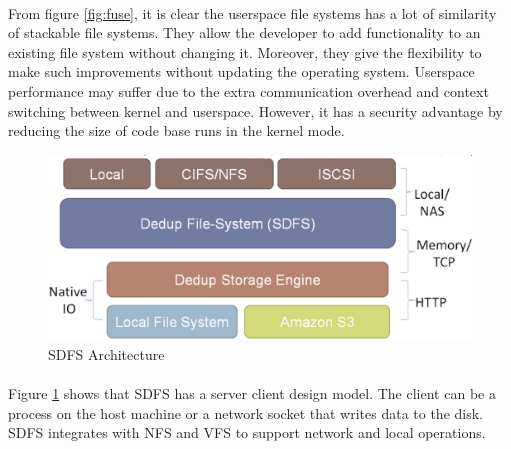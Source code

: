 \paragraph{}
From figure \ref{fig:fuse}, it is clear the userspace file systems has a lot of similarity of stackable file systems. They allow the developer
to add functionality to an existing file system without changing it. Moreover, they give the flexibility to make such improvements without 
updating the operating system. Userspace performance may suffer due to the extra communication overhead and context switching between kernel and userspace.
However, it has a security advantage by reducing the size of code base runs in the kernel mode.

\begin{figure}[H]
\begin{center}
\includegraphics[scale=0.30]{sdfs_arch.eps}
\caption{SDFS Architecture\cite{web:opendedup}}
\label{fig:sdfsarch}
\end{center}
\end{figure}

\paragraph{}
Figure \ref{fig:sdfsarch} shows that SDFS has a server client design model. The client can be a process on the host machine or a network socket that
writes data to the disk. SDFS integrates with NFS and VFS to support network and local operations. 

